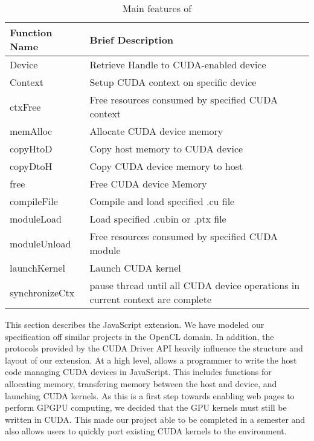 
\begin{table}
\begin{center}
\begin{tabular}{| l | p{5.5cm} | }
\hline
Function Name & Brief Description \\
\hline
Device & Retrieve Handle to CUDA-enabled device \\
\hline
Context & Setup CUDA context on specific device \\
\hline
ctxFree & Free resources consumed by specified CUDA context\\
\hline
memAlloc & Allocate CUDA device memory \\
\hline
copyHtoD  & Copy host memory to CUDA device \\
\hline
copyDtoH & Copy CUDA device memory to host \\
\hline
free & Free CUDA device Memory \\
\hline
compileFile & Compile and load specified .cu file \\
\hline
moduleLoad & Load specified .cubin or .ptx file \\
\hline
moduleUnload & Free resources consumed by specified CUDA module\\
\hline
launchKernel & Launch CUDA kernel\\
\hline
synchronizeCtx & pause thread until all CUDA device operations in current context are complete \\
\hline
\end{tabular}
\end{center}
\caption{Main features of \name}
\label{webcudaSpec}
\end{table}

This section describes the \name JavaScript extension. We have modeled our
specification off similar projects \cite{webCL, safariCL, nokiaCL, chromeCL} in
the OpenCL domain.  In addition, the protocols provided by the CUDA Driver API
\cite{cudaAPI} heavily influence the structure and layout of our extension. At a
high level, \name allows a programmer to write the host code managing CUDA
devices in JavaScript. This includes functions for allocating memory,
transfering memory between the host and device, and launching CUDA kernels. As
this is a first step towards enabling web pages to perform GPGPU computing, we
decided that the GPU kernels must still be written in CUDA. This made our
project able to be completed in a semester and also allows users to quickly port
existing CUDA kernels to the \name environment.


